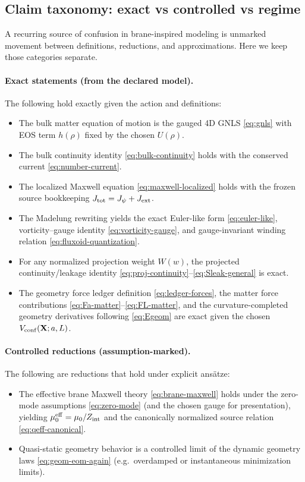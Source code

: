 \documentclass[11pt]{article}
\newcommand{\Zint}{Z_{\rm int}}
\begin{document}
\subsection{Claim taxonomy: exact vs controlled vs regime}
\label{sec:discussion-claims}

A recurring source of confusion in brane-inspired modeling is unmarked movement between definitions, reductions, and approximations. Here we keep those categories separate.

\paragraph{Exact statements (from the declared model).}
The following hold exactly given the action and definitions:
\begin{itemize}[leftmargin=2.0em]
\item The bulk matter equation of motion is the gauged 4D GNLS \eqref{eq:gnls} with EOS term $h(\rho)$ fixed by the chosen $U(\rho)$.
\item The bulk continuity identity \eqref{eq:bulk-continuity} holds with the conserved current \eqref{eq:number-current}.
\item The localized Maxwell equation \eqref{eq:maxwell-localized} holds with the frozen source bookkeeping $J_{\rm tot}=J_\psi+J_{\rm ext}$.
\item The Madelung rewriting yields the exact Euler-like form \eqref{eq:euler-like}, vorticity--gauge identity \eqref{eq:vorticity-gauge}, and gauge-invariant winding relation \eqref{eq:fluxoid-quantization}.
\item For any normalized projection weight $W(w)$, the projected continuity/leakage identity \eqref{eq:proj-continuity}--\eqref{eq:Sleak-general} is exact.
\item The geometry force ledger definition \eqref{eq:ledger-forces}, the matter force contributions \eqref{eq:Fa-matter}--\eqref{eq:FL-matter}, and the curvature-completed geometry derivatives following \eqref{eq:Egeom} are exact given the chosen $V_{\rm conf}(\mathbf{X};a,L)$.
\end{itemize}

\paragraph{Controlled reductions (assumption-marked).}
The following are reductions that hold under explicit ans\"atze:
\begin{itemize}[leftmargin=2.0em]
\item The effective brane Maxwell theory \eqref{eq:brane-maxwell} holds under the zero-mode assumptions \eqref{eq:zero-mode} (and the chosen gauge for presentation), yielding $\mu_0^{\rm eff}=\mu_0/\Zint$ and the canonically normalized source relation \eqref{eq:qeff-canonical}.
\item Quasi-static geometry behavior is a controlled limit of the dynamic geometry laws \eqref{eq:geom-eom-again} (e.g.\ overdamped or instantaneous minimization limits).
\end{itemize}
\end{document}
